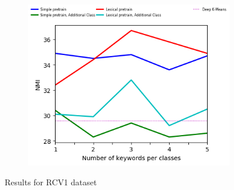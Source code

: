 \begin{figure}[!h]
\begin{subfigure}[b]{\textwidth}
  \end{subfigure}
  \begin{subfigure}[b]{\textwidth}
    \centering
    \includegraphics[scale=0.82]{parts/res/dat_file/nmi/RCV1_NMI.png}     
  \end{subfigure}
  \caption{\label{fig:rcv1}Results for RCV1 dataset}
\end{figure}

